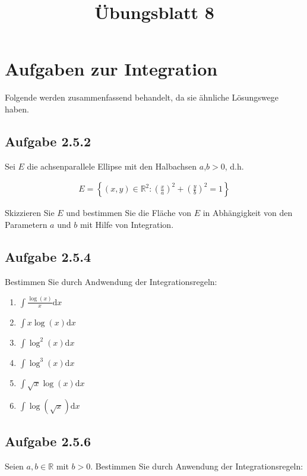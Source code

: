 \documentclass[a4paper]{article}
\title{Übungsblatt 8}
\date{}
\author{}
\newcommand*{\R}{\mathbb R}
\begin{document}
\maketitle

\section{Aufgaben zur Integration}

Folgende werden zusammenfassend behandelt, da sie ähnliche Lösungswege haben.

\subsection{Aufgabe 2.5.2}

Sei $E$ die achsenparallele Ellipse mit den Halbachsen $a$,$b>0$, d.h.

\begin{align}
  E=\left\{(x,y)\in\R^2: \left(\frac xa\right)^2+\left(\frac yb\right)^2=1\right\}
\end{align}

Skizzieren Sie $E$ und bestimmen Sie die Fläche von $E$ in Abhängigkeit von den Parametern $a$ und $b$ mit Hilfe von Integration.

\subsection{Aufgabe 2.5.4}

Bestimmen Sie durch Andwendung der Integrationsregeln:

\begin{enumerate}
  \item $\int \frac{\log(x)}{x} \mathrm dx$
  \item $\int x\log(x) \mathrm dx$
  \item $\int \log^2(x) \mathrm dx$
  \item $\int \log^3(x) \mathrm dx$
  \item $\int \sqrt{x} \log(x) \mathrm dx$
  \item $\int \log\left(\sqrt x\right) \mathrm dx$
\end{enumerate}

\subsection{Aufgabe 2.5.6}

Seien $a,b\in\R$ mit $b>0$. Bestimmen Sie durch Anwendung der Integrationsregeln:
\end{document}
